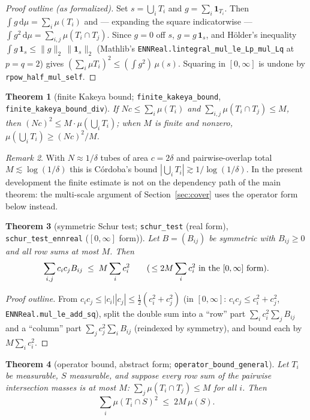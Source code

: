 \documentclass[11pt,a4paper]{article}
\newcommand{\ennr}{\ensuremath{[0,\infty]}}          %
\newcommand{\dd}{\mathrm{d}}
\newcommand{\ind}{\mathbf{1}}
\newcommand{\lname}[1]{\texttt{#1}}                  %
\newcommand{\lb}{\_\allowbreak}                      %
\newtheorem{theorem}{Theorem}[section]
\theoremstyle{definition}
\theoremstyle{remark}
\newtheorem{remark}[theorem]{Remark}
\begin{document}
\begin{proof}[Proof outline (as formalized)]
Set $s=\bigcup_i T_i$ and $g=\sum_i \ind_{T_i}$.  Then
$\int g\,\dd\mu = \sum_i \mu(T_i)$ and --- expanding the square indicatorwise ---
$\int g^2\,\dd\mu = \sum_{i,j}\mu(T_i\cap T_j)$.  Since $g=0$ off $s$,
$g = g\,\ind_s$, and H\"older's inequality
$\int g\,\ind_s \le \|g\|_2\,\|\ind_s\|_2$
(Mathlib's \lname{ENNReal.lintegral\_mul\_le\_Lp\_mul\_Lq} at $p=q=2$) gives
$(\sum_i\mu T_i)^2 \le (\int g^2)\,\mu(s)$.  Squaring in $\ennr$ is undone by
\lname{rpow\_half\_mul\_self}.
\end{proof}

\begin{theorem}[{finite Kakeya bound; \lname{finite\_kakeya\_bound},
\lname{finite\_kakeya\_bound\_div}}]
If $Nc\le \sum_i\mu(T_i)$ and $\sum_{i,j}\mu(T_i\cap T_j)\le M$, then
$(Nc)^2\le M\cdot\mu(\bigcup_i T_i)$; when $M$ is finite and nonzero,
$\mu(\bigcup_i T_i)\ge (Nc)^2/M$.
\end{theorem}

\begin{remark}
With $N\approx 1/\delta$ tubes of area $c=2\delta$ and pairwise-overlap total
$M\lesssim \log(1/\delta)$ this is C\'ordoba's bound
$|\bigcup_i T_i|\gtrsim 1/\log(1/\delta)$.  In the present development the finite
estimate is not on the dependency path of the main theorem: the multi-scale argument of
Section~\ref{sec:cover} uses the operator form below instead.
\end{remark}

\begin{theorem}[{symmetric Schur test; \lname{schur\_test} (real form),
\lname{schur\_test\_ennreal} ($\ennr$ form)}]
Let $B=(B_{ij})$ be symmetric with $B_{ij}\ge 0$ and all row sums at most $M$.  Then
\[
  \sum_{i,j} c_i c_j B_{ij} \;\le\; M \sum_i c_i^{2}
  \qquad\text{(\,$\le 2M\sum_i c_i^2$ in the $\ennr$ form).}
\]
\end{theorem}

\begin{proof}[Proof outline]
From $c_ic_j \le |c_i||c_j| \le \tfrac12(c_i^2+c_j^2)$
(in $\ennr$: $c_ic_j\le c_i^2+c_j^2$, \lname{ENNReal.mul\lb le\lb add\lb sq}), split the double
sum into a ``row'' part $\sum_i c_i^2\sum_j B_{ij}$ and a ``column'' part
$\sum_j c_j^2\sum_i B_{ij}$ (reindexed by symmetry), and bound each by $M\sum_i c_i^2$.
\end{proof}

\begin{theorem}[{operator bound, abstract form; \lname{operator\_bound\_general}}]
\label{thm:operator-bound-general}
Let $T_i$ be measurable, $S$ measurable, and suppose every row sum of the pairwise
intersection masses is at most $M$: $\sum_j \mu(T_i\cap T_j)\le M$ for all $i$.  Then
\[
  \sum_i \mu(T_i\cap S)^{2}\;\le\; 2M\,\mu(S).
\]
\end{theorem}
\end{document}
